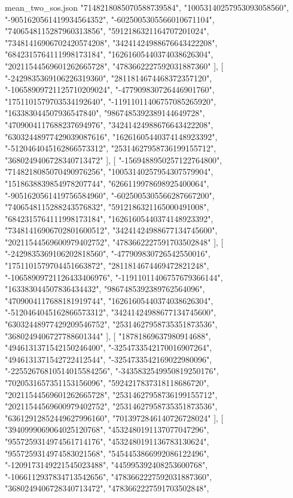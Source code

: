 \begin{filecontents*}[overwrite]{mean_two_sos.json}
    "7148218085070588739584",
    "10053140257953093058560",
    "-9051620561419934564352",
    "-6025005305566010671104",
    "7406548115287960313856",
    "5912186321164707201024",
    "73481416906702420574208",
    "34241424988676643422208",
    "6842315764111998173184",
    "16261605440374038626304",
    "20211544569601262665728",
    "4783662227592031887360"
   ],
   [
    "-2429835369106226319360",
    "2811814674468372357120",
    "-10658909721125710209024",
    "-477909830726446901760",
    "1751101579703534192640",
    "-11911011406757085265920",
    "163383044507936547840",
    "9867485392389144649728",
    "4709004117688237694976",
    "34241424988676643422208",
    "63032448977429039087616",
    "16261605440374148923392",
    "-5120464045162866573312",
    "25314627958736199155712",
    "3680249406728340713472"
   ],
   [
    "-1569488950257122764800",
    "7148218085070490976256",
    "10053140257954307579904",
    "1518638839854978207744",
    "6266119978698925400064",
    "-9051620561419756584960",
    "-6025005305566287667200",
    "7406548115288243576832",
    "5912186321165000491008",
    "6842315764111998173184",
    "16261605440374148923392",
    "73481416906702801600512",
    "34241424988677134745600",
    "20211544569600979402752",
    "4783662227591703502848"
   ],
   [
    "-2429835369106202818560",
    "-477909830726542550016",
    "1751101579704451663872",
    "2811814674469472821248",
    "-10658909721126433406976",
    "-11911011406757679366144",
    "163383044507836434432",
    "9867485392389762564096",
    "4709004117688181919744",
    "16261605440374038626304",
    "-5120464045162866573312",
    "34241424988677134745600",
    "63032448977429209546752",
    "25314627958735351873536",
    "3680249406727788601344"
   ],
   [
    "18781869637980914688",
    "4946131371542150246400",
    "-3254733542170016907264",
    "4946131371542722412544",
    "-3254733542169022980096",
    "-22552676810514015584256",
    "-3435832549950819250176",
    "7020531657351153156096",
    "5924217837318118686720",
    "20211544569601262665728",
    "25314627958736199155712",
    "20211544569600979402752",
    "25314627958735351873536",
    "63612912852449627996160",
    "7013972846140726728024"
   ],
   [
    "3940999069064025120768",
    "4532480191137077047296",
    "9557259314974561714176",
    "4532480191136783130624",
    "9557259314974583021568",
    "5454453866992086122496",
    "-1209173149221545023488",
    "445995392408253600768",
    "-1066112937834713542656",
    "4783662227592031887360",
    "3680249406728340713472",
    "4783662227591703502848",

\end{filecontents*}
